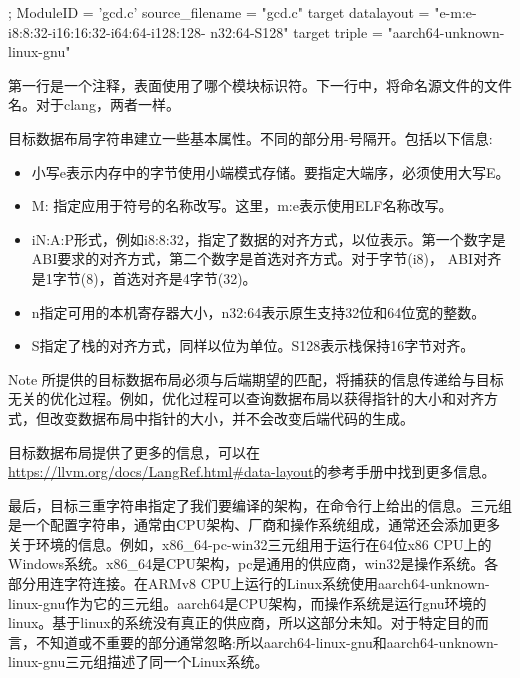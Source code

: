 \begin{shell}
; ModuleID = 'gcd.c'
source_filename = "gcd.c"
target datalayout = "e-m:e-i8:8:32-i16:16:32-i64:64-i128:128-
n32:64-S128"
target triple = "aarch64-unknown-linux-gnu"
\end{shell}

第一行是一个注释，表面使用了哪个模块标识符。下一行中，将命名源文件的文件名。对于clang，两者一样。

目标数据布局字符串建立一些基本属性。不同的部分用-号隔开。包括以下信息:

\begin{itemize}
\item
小写e表示内存中的字节使用小端模式存储。要指定大端序，必须使用大写E。

\item
M: 指定应用于符号的名称改写。这里，m:e表示使用ELF名称改写。

\item
iN:A:P形式，例如i8:8:32，指定了数据的对齐方式，以位表示。第一个数字是ABI要求的对齐方式，第二个数字是首选对齐方式。对于字节(i8)， ABI对齐是1字节(8)，首选对齐是4字节(32)。

\item
n指定可用的本机寄存器大小，n32:64表示原生支持32位和64位宽的整数。

\item
S指定了栈的对齐方式，同样以位为单位。S128表示栈保持16字节对齐。
\end{itemize}

\begin{myNotic}{Note}
所提供的目标数据布局必须与后端期望的匹配，将捕获的信息传递给与目标无关的优化过程。例如，优化过程可以查询数据布局以获得指针的大小和对齐方式，但改变数据布局中指针的大小，并不会改变后端代码的生成。

目标数据布局提供了更多的信息，可以在\url{https://llvm.org/docs/LangRef.html#data-layout}的参考手册中找到更多信息。
\end{myNotic}

最后，目标三重字符串指定了我们要编译的架构，在命令行上给出的信息。三元组是一个配置字符串，通常由CPU架构、厂商和操作系统组成，通常还会添加更多关于环境的信息。例如，x86\_64-pc-win32三元组用于运行在64位x86 CPU上的Windows系统。x86\_64是CPU架构，pc是通用的供应商，win32是操作系统。各部分用连字符连接。在ARMv8 CPU上运行的Linux系统使用aarch64-unknown-linux-gnu作为它的三元组。aarch64是CPU架构，而操作系统是运行gnu环境的linux。基于linux的系统没有真正的供应商，所以这部分未知。对于特定目的而言，不知道或不重要的部分通常忽略:所以aarch64-linux-gnu和aarch64-unknown-linux-gnu三元组描述了同一个Linux系统。


